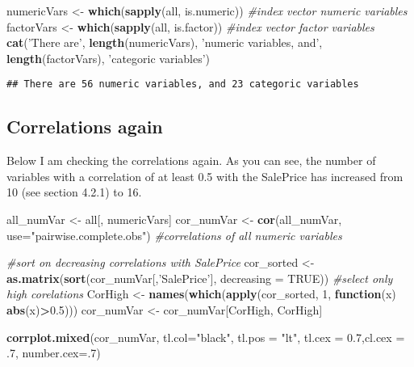 \documentclass[]{article}
\newenvironment{Shaded}{\begin{snugshade}}{\end{snugshade}}
\newcommand{\KeywordTok}[1]{\textcolor[rgb]{0.13,0.29,0.53}{\textbf{#1}}}
\newcommand{\DataTypeTok}[1]{\textcolor[rgb]{0.13,0.29,0.53}{#1}}
\newcommand{\DecValTok}[1]{\textcolor[rgb]{0.00,0.00,0.81}{#1}}
\newcommand{\FloatTok}[1]{\textcolor[rgb]{0.00,0.00,0.81}{#1}}
\newcommand{\StringTok}[1]{\textcolor[rgb]{0.31,0.60,0.02}{#1}}
\newcommand{\CommentTok}[1]{\textcolor[rgb]{0.56,0.35,0.01}{\textit{#1}}}
\newcommand{\OtherTok}[1]{\textcolor[rgb]{0.56,0.35,0.01}{#1}}
\newcommand{\ControlFlowTok}[1]{\textcolor[rgb]{0.13,0.29,0.53}{\textbf{#1}}}
\newcommand{\OperatorTok}[1]{\textcolor[rgb]{0.81,0.36,0.00}{\textbf{#1}}}
\newcommand{\NormalTok}[1]{#1}
\begin{document}
\begin{Shaded}
\begin{Highlighting}[]
\NormalTok{numericVars <-}\StringTok{ }\KeywordTok{which}\NormalTok{(}\KeywordTok{sapply}\NormalTok{(all, is.numeric)) }\CommentTok{#index vector numeric variables}
\NormalTok{factorVars <-}\StringTok{ }\KeywordTok{which}\NormalTok{(}\KeywordTok{sapply}\NormalTok{(all, is.factor)) }\CommentTok{#index vector factor variables}
\KeywordTok{cat}\NormalTok{(}\StringTok{'There are'}\NormalTok{, }\KeywordTok{length}\NormalTok{(numericVars), }\StringTok{'numeric variables, and'}\NormalTok{, }\KeywordTok{length}\NormalTok{(factorVars), }\StringTok{'categoric variables'}\NormalTok{)}
\end{Highlighting}
\end{Shaded}

\begin{verbatim}
## There are 56 numeric variables, and 23 categoric variables
\end{verbatim}

\subsection{Correlations again}\label{correlations-again}

Below I am checking the correlations again. As you can see, the number
of variables with a correlation of at least 0.5 with the SalePrice has
increased from 10 (see section 4.2.1) to 16.

\begin{Shaded}
\begin{Highlighting}[]
\NormalTok{all_numVar <-}\StringTok{ }\NormalTok{all[, numericVars]}
\NormalTok{cor_numVar <-}\StringTok{ }\KeywordTok{cor}\NormalTok{(all_numVar, }\DataTypeTok{use=}\StringTok{"pairwise.complete.obs"}\NormalTok{) }\CommentTok{#correlations of all numeric variables}

\CommentTok{#sort on decreasing correlations with SalePrice}
\NormalTok{cor_sorted <-}\StringTok{ }\KeywordTok{as.matrix}\NormalTok{(}\KeywordTok{sort}\NormalTok{(cor_numVar[,}\StringTok{'SalePrice'}\NormalTok{], }\DataTypeTok{decreasing =} \OtherTok{TRUE}\NormalTok{))}
 \CommentTok{#select only high corelations}
\NormalTok{CorHigh <-}\StringTok{ }\KeywordTok{names}\NormalTok{(}\KeywordTok{which}\NormalTok{(}\KeywordTok{apply}\NormalTok{(cor_sorted, }\DecValTok{1}\NormalTok{, }\ControlFlowTok{function}\NormalTok{(x) }\KeywordTok{abs}\NormalTok{(x)}\OperatorTok{>}\FloatTok{0.5}\NormalTok{)))}
\NormalTok{cor_numVar <-}\StringTok{ }\NormalTok{cor_numVar[CorHigh, CorHigh]}

\KeywordTok{corrplot.mixed}\NormalTok{(cor_numVar, }\DataTypeTok{tl.col=}\StringTok{"black"}\NormalTok{, }\DataTypeTok{tl.pos =} \StringTok{"lt"}\NormalTok{, }\DataTypeTok{tl.cex =} \FloatTok{0.7}\NormalTok{,}\DataTypeTok{cl.cex =}\NormalTok{ .}\DecValTok{7}\NormalTok{, }\DataTypeTok{number.cex=}\NormalTok{.}\DecValTok{7}\NormalTok{)}
\end{Highlighting}
\end{Shaded}
\end{document}
